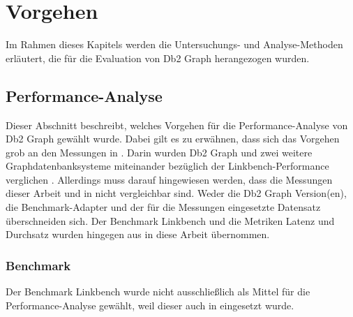 \chapter{Vorgehen}
\label{vorgehen}
Im Rahmen dieses Kapitels werden die Untersuchungs- und Analyse-Methoden erläutert, die für die Evaluation von Db2 Graph herangezogen wurden. 

\section{Performance-Analyse}
\label{vorgehen:performance-analyse}
Dieser Abschnitt beschreibt, welches Vorgehen für die Performance-Analyse von Db2 Graph gewählt wurde. Dabei gilt es zu erwähnen, dass sich das Vorgehen grob an den Messungen in \cite{sigmod_tian}. Darin wurden Db2 Graph und zwei weitere Graphdatenbanksysteme miteinander bezüglich der Linkbench-Performance verglichen \cite{sigmod_tian}. Allerdings muss darauf hingewiesen werden, dass die Messungen dieser Arbeit und in \cite{sigmod_tian} nicht vergleichbar sind. Weder die Db2 Graph Version(en), die Benchmark-Adapter und der für die Messungen eingesetzte Datensatz überschneiden sich. Der Benchmark Linkbench und die Metriken Latenz und Durchsatz wurden hingegen aus \cite{sigmod_tian} in diese Arbeit übernommen. 

\subsection{Benchmark}
Der Benchmark Linkbench wurde nicht ausschließlich als Mittel für die Performance-Analyse gewählt, weil dieser auch in \cite{sigmod_tian} eingesetzt wurde. 

